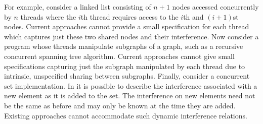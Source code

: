 For example, consider a linked list consisting of $n+1$ nodes accessed
concurrently by $n$ threads where the $i$th
thread requires access to the $i$th and $(i+1)$st nodes. Current
approaches cannot provide a small specification for each thread which
captures  just these two shared nodes and their interference. Now
consider a program whose threads manipulate subgraphs of a graph, such
as a recursive
concurrent spanning tree algorithm. Current approaches cannot give small specifications capturing just the subgraph manipulated by each thread due to intrinsic, unspecified sharing  between subgraphs.
Finally, consider a concurrent set implementation. In \colosl it is
possible to describe the interference associated with a new element as it is added to the set. The interference on new elements need not be the same as before and may only be known at the time they are added. Existing approaches cannot accommodate such dynamic interference relations.




